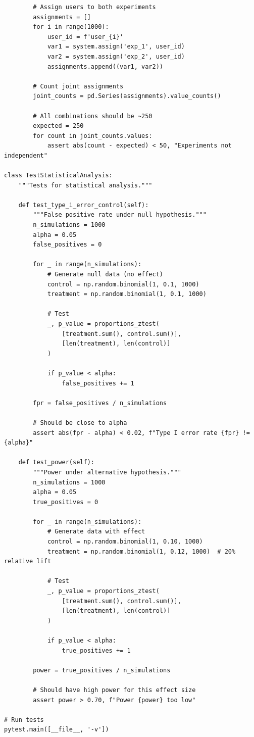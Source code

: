 \begin{lstlisting}
        # Assign users to both experiments
        assignments = []
        for i in range(1000):
            user_id = f'user_{i}'
            var1 = system.assign('exp_1', user_id)
            var2 = system.assign('exp_2', user_id)
            assignments.append((var1, var2))

        # Count joint assignments
        joint_counts = pd.Series(assignments).value_counts()

        # All combinations should be ~250
        expected = 250
        for count in joint_counts.values:
            assert abs(count - expected) < 50, "Experiments not independent"

class TestStatisticalAnalysis:
    """Tests for statistical analysis."""

    def test_type_i_error_control(self):
        """False positive rate under null hypothesis."""
        n_simulations = 1000
        alpha = 0.05
        false_positives = 0

        for _ in range(n_simulations):
            # Generate null data (no effect)
            control = np.random.binomial(1, 0.1, 1000)
            treatment = np.random.binomial(1, 0.1, 1000)

            # Test
            _, p_value = proportions_ztest(
                [treatment.sum(), control.sum()],
                [len(treatment), len(control)]
            )

            if p_value < alpha:
                false_positives += 1

        fpr = false_positives / n_simulations

        # Should be close to alpha
        assert abs(fpr - alpha) < 0.02, f"Type I error rate {fpr} != {alpha}"

    def test_power(self):
        """Power under alternative hypothesis."""
        n_simulations = 1000
        alpha = 0.05
        true_positives = 0

        for _ in range(n_simulations):
            # Generate data with effect
            control = np.random.binomial(1, 0.10, 1000)
            treatment = np.random.binomial(1, 0.12, 1000)  # 20% relative lift

            # Test
            _, p_value = proportions_ztest(
                [treatment.sum(), control.sum()],
                [len(treatment), len(control)]
            )

            if p_value < alpha:
                true_positives += 1

        power = true_positives / n_simulations

        # Should have high power for this effect size
        assert power > 0.70, f"Power {power} too low"

# Run tests
pytest.main([__file__, '-v'])
\end{lstlisting}

